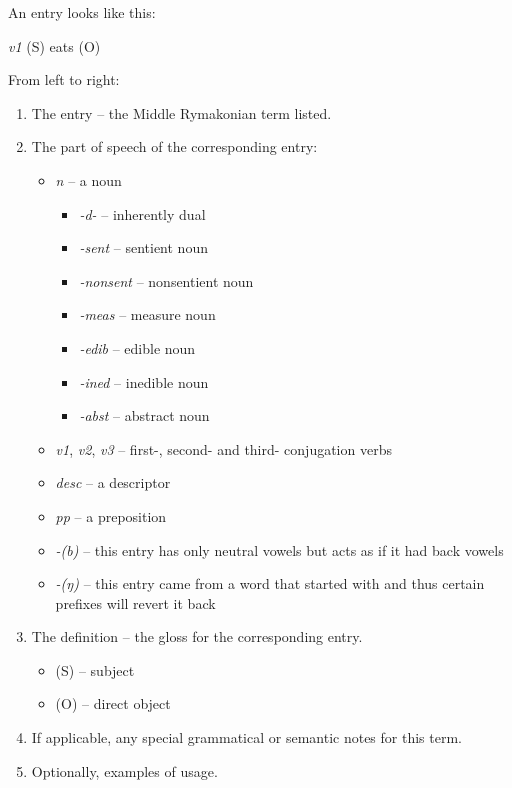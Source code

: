 \documentclass{book}
\newcommand{\lname}{Middle Rymakonian}
\begin{document}
An entry looks like this:

 \textit{v1}
\quad (S) eats (O)

From left to right:

\begin{enumerate}
    \item The entry -- the \lname{} term listed.
    \item The part of speech of the corresponding entry:
    \begin{itemize}
        \item \textit{n} -- a noun
        \begin{itemize}
          \item \textit{-d-} -- inherently dual
          \item \textit{-sent} -- sentient noun
          \item \textit{-nonsent} -- nonsentient noun
          \item \textit{-meas} -- measure noun
          \item \textit{-edib} -- edible noun
          \item \textit{-ined} -- inedible noun
          \item \textit{-abst} -- abstract noun
        \end{itemize}
        \item \textit{v1}, \textit{v2}, \textit{v3} -- first-, second- and third- conjugation verbs
        \item \textit{desc} -- a descriptor
        \item \textit{pp} -- a preposition
        \item \textit{-(b)} -- this entry has only neutral vowels but acts as if it had back vowels
        \item \textit{-(ŋ)} -- this entry came from a word that started with  and thus certain prefixes will revert it back
    \end{itemize}
    \item The definition -- the gloss for the corresponding entry.
    \begin{itemize}
        \item (S) -- subject
        \item (O) -- direct object
    \end{itemize}
    \item If applicable, any special grammatical or semantic notes for this term.
    \item Optionally, examples of usage.
\end{enumerate}

\begin{multicols}{2}
    
\end{multicols}
\end{document}
